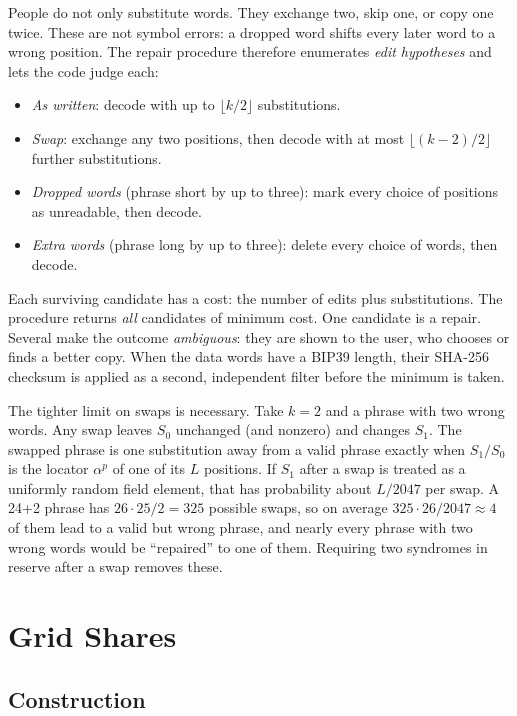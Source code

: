 \documentclass[numeric]{anvil-paper}
\begin{document}
People do not only substitute words. They exchange two, skip one, or copy one
twice. These are not symbol errors: a dropped word shifts every later word to a
wrong position. The repair procedure therefore enumerates \emph{edit
hypotheses} and lets the code judge each:
\begin{itemize}
\item \emph{As written}: decode with up to $\lfloor k/2\rfloor$ substitutions.
\item \emph{Swap}: exchange any two positions, then decode with at most
  $\lfloor (k-2)/2\rfloor$ further substitutions.
\item \emph{Dropped words} (phrase short by up to three): mark every choice of
  positions as unreadable, then decode.
\item \emph{Extra words} (phrase long by up to three): delete every choice of
  words, then decode.
\end{itemize}
Each surviving candidate has a cost: the number of edits plus substitutions.
The procedure returns \emph{all} candidates of minimum cost. One candidate is a
repair. Several make the outcome \emph{ambiguous}: they are shown to the user,
who chooses or finds a better copy. When the data words have a BIP39 length,
their SHA-256 checksum is applied as a second, independent filter before the
minimum is taken.

The tighter limit on swaps is necessary. Take $k=2$ and a phrase with two
wrong words. Any swap leaves $S_0$ unchanged (and nonzero) and changes $S_1$.
The swapped phrase is one substitution away from a valid phrase exactly when
$S_1/S_0$ is the locator $\alpha^p$ of one of its $L$ positions. If $S_1$ after
a swap is treated as a uniformly random field element, that has probability
about $L/2047$ per swap. A 24+2 phrase has $26\cdot25/2=325$ possible swaps,
so on average $325\cdot 26/2047\approx 4$ of them lead to a valid but wrong
phrase, and nearly every phrase with two wrong words would be ``repaired''
to one of them. Requiring two syndromes in reserve after a swap removes
these.

\section{Grid Shares}
\label{sec:grid}

\subsection{Construction}
\end{document}
